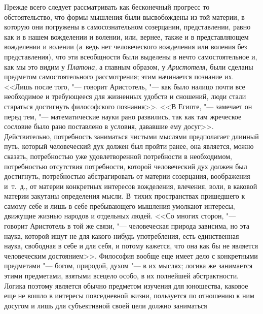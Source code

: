 Прежде всего следует рассматривать как бесконечный прогресс то обстоятельство,
что формы мышления были высвобождены из той материи, в которую они погружены в
самосознательном созерцании, представлении, равно как и в нашем вожделении и
волении, или, вернее, также и в представляющем вожделении и волении (а~ведь нет
человеческого вожделения или воления без представления), что эти всеобщности
были выделены в нечто самостоятельное и, как мы это видим у {\em Платона,} а
главным образом, у {\em Аристотеля,} были сделаны предметом самостоятельного
рассмотрения; этим начинается познание их. <<Лишь после того, "--- говорит
Аристотель, "--- как было налицо почти все необходимое и требующееся для
жизненных удобств и сношений, люди стали стараться достигнуть философского
познания>>. <<В Египте,
"--- замечает он перед тем, "--- математические науки рано развились, так как
там жреческое сословие было рано поставлено в условия, дававшие ему
досуг>>.
Действительно, потребность заниматься чистыми мыслями предполагает длинный
путь, который человеческий дух должен был пройти ранее, она является, можно
сказать, потребностью уже удовлетворенной потребности в необходимом,
потребностью отсутствия потребности, которой человеческий дух должен был
достигнуть, потребностью абстрагировать от материи созерцания, воображения
и~т.~д., от материи конкретных интересов вожделения, влечения, воли, в каковой
материи закутаны определения мысли. В~тихих пространствах пришедшего к самому
себе и лишь в себе пребывающего мышления умолкают интересы, движущие жизнью
народов и отдельных людей. <<Со многих сторон, "--- говорит Аристотель в той же
связи, "--- человеческая природа зависима, но эта наука, которой ищут не для
какого-нибудь употребления, есть единственная наука, свободная в себе и для
себя, и потому кажется, что она как бы не является человеческим
достоянием>>. Философия вообще еще
имеет дело с конкретными предметами "--- богом, природой, духом "--- в их
мыслях; логика же занимается этими предметами, взятыми всецело особо, в их
полнейшей абстрактности. Логика поэтому является обычно предметом изучения для
юношества, каковое еще не вошло в интересы повседневной жизни, пользуется по
отношению к ним досугом и лишь для субъективной своей цели должно заниматься
